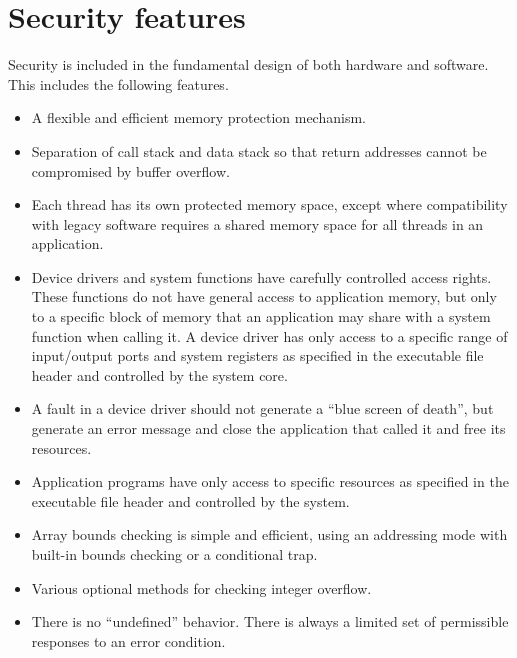 \documentclass[forwardcom.tex]{subfiles}
\begin{document}
\section{Security features} \label{securityFeatures}
Security is included in the fundamental design of both hardware and software. This includes the following features.

\begin{itemize}
\item A flexible and efficient memory protection mechanism.

\item Separation of call stack and data stack so that return addresses cannot be compromised by buffer overflow.

\item Each thread has its own protected memory space, except where compatibility with legacy 
software requires a shared memory space for all threads in an application.

\item Device drivers and system functions have carefully controlled access rights. These functions do not have general access to application memory, but only to a specific block of memory that an application may share with a system function when calling it. A device driver has only access to a specific range of input/output ports and system registers as specified in the executable file header and controlled by the system core.

\item A fault in a device driver should not generate a ``blue screen of death'', but generate an error message and close the application that called it and free its resources.

\item Application programs have only access to specific resources as specified in the executable file header and controlled by the system.

\item Array bounds checking is simple and efficient, using an addressing mode with built-in bounds checking or a conditional trap.

\item Various optional methods for checking integer overflow.

\item There is no ``undefined'' behavior. There is always a limited set of permissible responses to an error condition.
\end{itemize}
\end{document}
